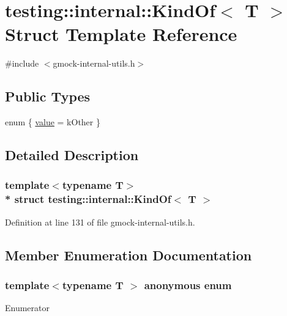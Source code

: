 \hypertarget{structtesting_1_1internal_1_1_kind_of}{}\section{testing\+:\+:internal\+:\+:Kind\+Of$<$ T $>$ Struct Template Reference}
\label{structtesting_1_1internal_1_1_kind_of}


{\ttfamily \#include $<$gmock-\/internal-\/utils.\+h$>$}

\subsection*{Public Types}
\begin{DoxyCompactItemize}
\item 
enum \{ \hyperlink{structtesting_1_1internal_1_1_kind_of_a4866389a4bc8d5522b5f8ae61a42f520a30d28b30579739dfb2d410825ac3aaa8}{value} = k\+Other
 \}
\end{DoxyCompactItemize}


\subsection{Detailed Description}
\subsubsection*{template$<$typename T$>$\\*
struct testing\+::internal\+::\+Kind\+Of$<$ T $>$}



Definition at line 131 of file gmock-\/internal-\/utils.\+h.



\subsection{Member Enumeration Documentation}
\subsubsection[{\texorpdfstring{anonymous enum}{anonymous enum}}]{\setlength{\rightskip}{0pt plus 5cm}template$<$typename T $>$ anonymous enum}\hypertarget{structtesting_1_1internal_1_1_kind_of_a4866389a4bc8d5522b5f8ae61a42f520}{}\label{structtesting_1_1internal_1_1_kind_of_a4866389a4bc8d5522b5f8ae61a42f520}
\begin{Desc}
\item[Enumerator]\par
\begin{description}
\item[{\em 
value\hypertarget{structtesting_1_1internal_1_1_kind_of_a4866389a4bc8d5522b5f8ae61a42f520a30d28b30579739dfb2d410825ac3aaa8}{}\label{structtesting_1_1internal_1_1_kind_of_a4866389a4bc8d5522b5f8ae61a42f520a30d28b30579739dfb2d410825ac3aaa8}
}]\end{description}
\end{Desc}


